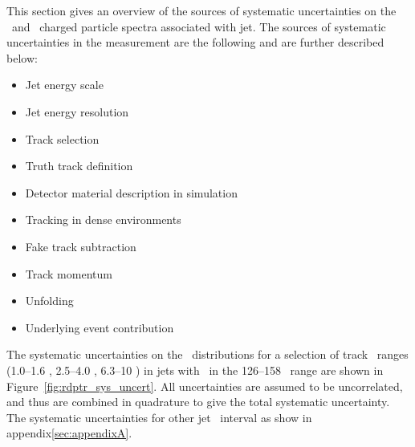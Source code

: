 
This section gives an overview of the sources of systematic uncertainties on the \pp\ and \pbpb\ charged particle spectra associated with jet. The sources of systematic uncertainties in the measurement are the following and are further described below:

\begin{itemize}

\item Jet energy scale

\item Jet energy resolution

\item Track selection

\item Truth track definition

\item Detector material description in simulation

\item Tracking in dense environments

\item Fake track subtraction

\item Track momentum

\item Unfolding

\item Underlying event contribution


\end{itemize}


The systematic uncertainties on the \Rdptr\ distributions for a selection of track \pt\ ranges (1.0--1.6 \GeV, 2.5--4.0 \GeV, 6.3--10 \GeV) in jets with \pt\ in the 126--158 \GeV\ range are shown in Figure~\ref{fig:rdptr_sys_uncert}. All uncertainties are assumed to be uncorrelated, and thus are combined in quadrature to give the total systematic uncertainty. The systematic uncertainties for other jet \pT\ interval as show in appendix\ref{sec:appendixA}. 

